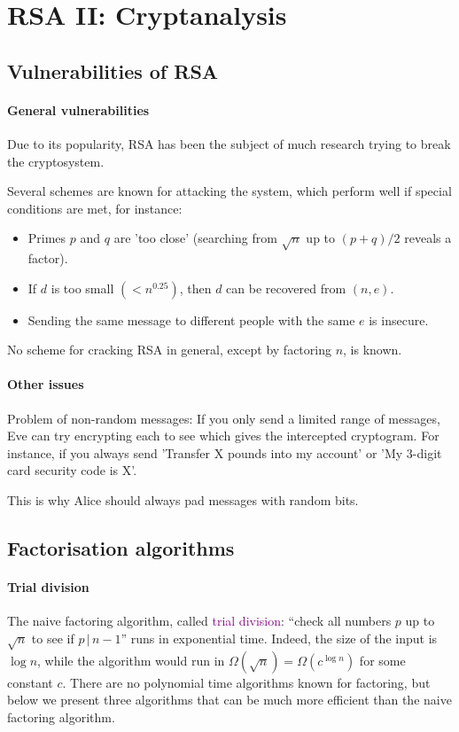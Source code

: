 \documentclass[a4paper, 11pt, openany]{book}
\numberwithin{equation}{section}
\theoremstyle{plain}
\theoremstyle{definition}
\newcommand{\divides}{\,|\,}
\newcommand{\Define}[1]{\textcolor{purple}{#1}}
\begin{document}
\section{RSA II: Cryptanalysis}
\label{sec:15}
\subsection{Vulnerabilities of RSA}

\paragraph{General vulnerabilities}

Due to its popularity, RSA has been the subject of much research trying to break the cryptosystem.

Several schemes are known for attacking the system, which perform well if special conditions are met, for instance:
\begin{itemize}
    \item Primes $p$ and $q$ are 'too close' (searching from $\sqrt{n}$ up to $(p+q)/2$ reveals a factor).
    
    \item If $d$ is too small $(< n^{0.25})$, then $d$ can be recovered from $(n,e)$.
    
    \item Sending the same message to different people with the same $e$ is insecure.
\end{itemize}

No scheme for cracking RSA in general, except by factoring $n$, is known.


\paragraph{Other issues}
Problem of non-random messages: If you only send a limited range of messages, Eve can try encrypting each to see which gives the intercepted cryptogram. For instance, if you always send 'Transfer X pounds into my account' or 'My 3-digit card security code is X'.

This is why Alice should always pad messages with random bits.



\subsection{Factorisation algorithms}

\paragraph{Trial division}
The naive factoring algorithm, called \Define{trial division}: ``check all numbers $p$ up to $\sqrt{n}$ to see if $p \divides n-1$'' runs in exponential time. Indeed, the size of the input is $\log n$, while the algorithm would run in $\Omega(\sqrt{n}) = \Omega( c^{\log n} )$ for some constant $c$. There are no polynomial time algorithms known for factoring, but below we present three algorithms that can be much more efficient than the naive factoring algorithm.
\end{document}
